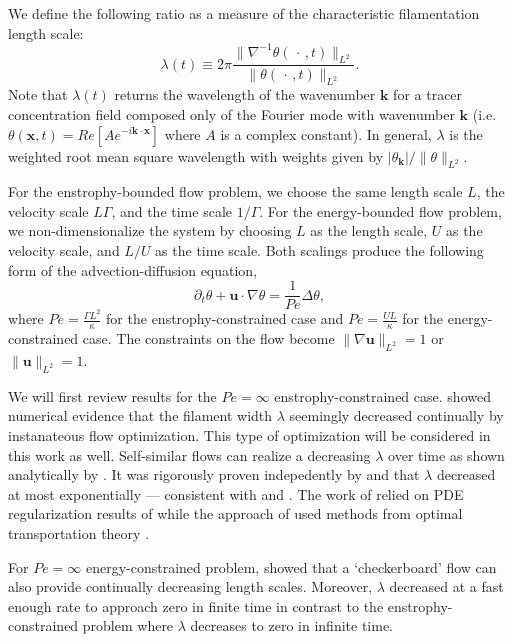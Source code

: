 \documentclass[12pt]{iopart}
\newcommand{\ltwo}[1]{\|#1\|_{L^{2}}}
\renewcommand{\vec}[1]{\mathbf{#1}}
\renewcommand{\u}{\mathbf{u}}
\newcommand{\ppt}[1]{\partial_{t} #1}
\newcommand{\lap}{\Delta }
\begin{document}
We define the following ratio as a measure of the characteristic filamentation length scale:
\begin{equation}
\lambda(t)\equiv  2\pi \frac{\|\nabla^{-1}\theta(\,\cdot\,,t)\|_{L^{2}}}{\|\theta(\,\cdot\,,t)\|_{L^{2}}}.
\end{equation}
Note that $\lambda(t)$ returns the wavelength of the wavenumber $\vec{k}$ for a tracer concentration field composed only of the Fourier mode with wavenumber $\vec{k}$ (i.e. $\theta(\vec{x},t) = Re[ A e^{-i\vec{k}\cdot \vec{x}}]$ where $A$ is a complex constant). In general, $\lambda$ is the weighted root mean square wavelength with weights given by $|\theta_{\vec{k}}|/\ltwo{\theta}$. 


For the enstrophy-bounded flow problem, we choose the same length scale $L$, the velocity scale $L\Gamma $, and  the time scale $1/\Gamma$. For the energy-bounded flow problem, we non-dimensionalize the system by choosing $L$ as the length scale, $U$ as the velocity scale, and $L/U$ as the time scale.  Both scalings produce the following form of the advection-diffusion equation,
\begin{equation}
\label{eq:nd_ade}
	\ppt{\theta}+\mathbf{u}\cdot \nabla \theta=\frac{1}{Pe} \lap\theta,
\end{equation}
where $Pe=  \frac{\Gamma L^2}{\kappa}$ for the enstrophy-constrained case and $Pe= \frac{UL}{\kappa}$ for the energy-constrained case.   The constraints on the flow become $\ltwo{\nabla\u} = 1$ or $\ltwo{\u} = 1$.



We will first review results for the $Pe = \infty$ enstrophy-constrained case. \cite{JFM2011} showed numerical evidence that the filament width $\lambda$ seemingly decreased continually by instanateous flow optimization. This type of optimization will be considered in this work as well. Self-similar flows can realize a decreasing $\lambda$ over time as shown analytically by \cite{Alberti2014a}.  It was rigorously proven indepedently by \cite{GI2014} and \cite{CS2013} that $\lambda$ decreased at most exponentially --- consistent with \cite{JFM2011}  and \cite{Alberti2014a}. The work of \cite{GI2014} relied on PDE regularization results of \cite{Crippa} while the approach of \cite{CS2013} used methods from optimal transportation theory \cite{villani2003topics}.

For $Pe = \infty$ energy-constrained problem, \cite{JMP2012} showed that a `checkerboard' flow can also provide continually decreasing length scales. Moreover, $\lambda$ decreased at a fast enough rate to approach zero in finite time in contrast to the enstrophy-constrained problem where $\lambda$ decreases to zero in infinite time.
\end{document}
